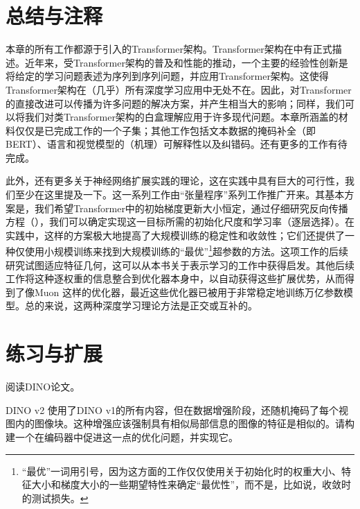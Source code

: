 \documentclass[../../book-main.tex]{subfiles}
\begin{document}
\section{总结与注释}

本章的所有工作都源于\citet{vaswani2017attention}引入的Transformer架构。Transformer架构在中有正式描述。近年来，受Transformer架构的普及和性能的推动，一个主要的经验性创新是将给定的学习问题表述为序列到序列问题，并应用Transformer架构。这使得Transformer架构在（几乎）所有深度学习应用中无处不在。因此，对Transformer的直接改进可以传播为许多问题的解决方案，并产生相当大的影响；同样，我们可以将我们对类Transformer架构的白盒理解应用于许多现代问题。本章所涵盖的材料仅仅是已完成工作的一个子集；其他工作包括文本数据的掩码补全（即BERT）\citep{devlin2019bert,yu2024white}、语言和视觉模型的（机理）可解释性\citep{bai2024improving}以及纠错码\citep{zheng2025white}。还有更多的工作有待完成。

此外，还有更多关于神经网络扩展实践的理论，这在实践中具有巨大的可行性，我们至少在这里提及一下。这一系列工作由“张量程序”系列工作\citep{yang2022tensor}推广开来。其基本方案是，我们希望Transformer中的初始梯度更新大小恒定，通过仔细研究反向传播方程（），我们可以确定实现这一目标所需的初始化尺度和学习率（逐层选择）。在实践中，这样的方案极大地提高了大规模训练的稳定性和收敛性；它们还提供了一种仅使用小规模训练来找到大规模训练的“最优”\footnote{“最优”一词用引号，因为这方面的工作仅仅使用关于初始化时的权重大小、特征大小和梯度大小的一些期望特性来确定“最优性”，而不是，比如说，收敛时的测试损失。}超参数的方法。这项工作的后续研究试图适应特征几何\citep{bernstein2024oldoptimizernewnorm}，这可以从本书关于表示学习的工作中获得启发。其他后续工作将这种逐权重的信息整合到优化器本身中，以自动获得这些扩展优势，从而得到了像Muon \citep{jordan6muon}这样的优化器，最近这些优化器已被用于非常稳定地训练万亿参数模型\citep{moonshot2025kimi}。总的来说，这两种深度学习理论方法是正交或互补的。


\section{练习与扩展}

\begin{exercise}
    阅读DINO论文\cite{caron2021emerging}。
\end{exercise}

\begin{exercise}
    DINO v2 \cite{oquab2023dinov2}使用了DINO v1的所有内容，但在数据增强阶段，还随机掩码了每个视图内的图像块。这种增强应该强制具有相似局部信息的图像的特征是相似的。请构建一个在编码器中促进这一点的优化问题，并实现它。
\end{exercise}
\end{document}
